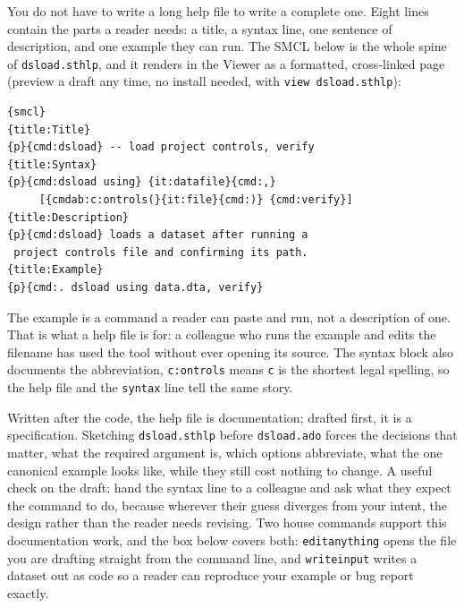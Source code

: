 \documentclass[
    a4paper,
    fontsize=10pt,
    twoside=true,
    numbers=noenddot,
]{kaobook}
\begin{document}
You do not have to write a long help file to write a complete one. Eight lines contain the parts a reader needs: a title, a syntax line, one sentence of description, and one example they can run. The SMCL below is the whole spine of \texttt{dsload.sthlp}, and it renders in the Viewer as a formatted, cross-linked page (preview a draft any time, no install needed, with \texttt{view dsload.sthlp}):
\par
{\footnotesize
\begin{verbatim}
{smcl}
{title:Title}
{p}{cmd:dsload} -- load project controls, verify
{title:Syntax}
{p}{cmd:dsload using} {it:datafile}{cmd:,}
     [{cmdab:c:ontrols(}{it:file}{cmd:)} {cmd:verify}]
{title:Description}
{p}{cmd:dsload} loads a dataset after running a
 project controls file and confirming its path.
{title:Example}
{p}{cmd:. dsload using data.dta, verify}
\end{verbatim}
}
The example is a command a reader can paste and run, not a description of one. That is what a help file is for: a colleague who runs the example and edits the filename has used the tool without ever opening its source. The syntax block also documents the abbreviation, \texttt{c:ontrols} means \texttt{c} is the shortest legal spelling, so the help file and the \texttt{syntax} line tell the same story.

Written after the code, the help file is documentation; drafted first, it is a specification. Sketching \texttt{dsload.sthlp} before \texttt{dsload.ado} forces the decisions that matter, what the required argument is, which options abbreviate, what the one canonical example looks like, while they still cost nothing to change. A useful check on the draft: hand the syntax line to a colleague and ask what they expect the command to do, because wherever their guess diverges from your intent, the design rather than the reader needs revising. Two house commands support this documentation work, and the box below covers both: \texttt{editanything} opens the file you are drafting straight from the command line, and \texttt{writeinput} writes a dataset out as code so a reader can reproduce your example or bug report exactly.
\end{document}
